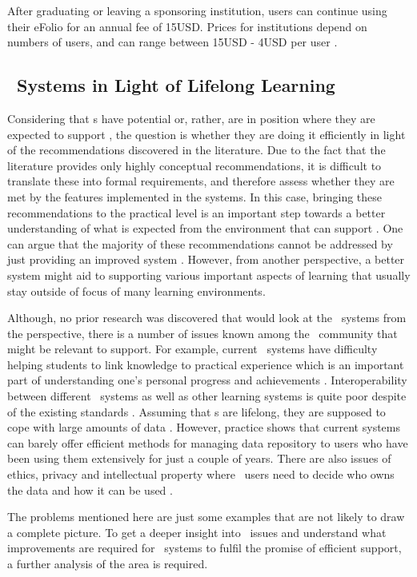 After graduating or leaving a sponsoring institution, users can continue
using their eFolio for an annual fee of 15USD. Prices for institutions depend
on numbers of users, and can range between 15USD - 4USD per user
\citep{AAEEBL2011}.

\subsection{\ep~Systems in Light of Lifelong Learning}

Considering that \ep s have potential or, rather, are in position where they are
expected to support \LLLsn, the question is whether they are doing it
efficiently in light of the recommendations discovered in the literature. Due
to the fact that the literature provides only highly conceptual recommendations,
it is difficult to translate these into formal requirements, and therefore
assess whether they are met by the features implemented in the systems. In this
case, bringing these recommendations to the practical level is an important step
towards a better understanding of what is expected from the environment that can
support \LLLsn. One can argue that the majority of these recommendations cannot
be addressed by just providing an improved system \citep{Schaffert2008}.
However, from another perspective, a better system might aid to supporting
various important aspects of learning that usually stay outside of focus of many
learning environments.

Although, no prior research was discovered that would look at the \ep~systems
from the \LLLs perspective, there is a number of issues known among the
\ep~community that might be relevant to \LLLs support. For example, current
\ep~systems have difficulty helping students to link knowledge to practical
experience which is an important part of understanding one's personal progress
and achievements \citep{Chou2009}. Interoperability between different
\ep~systems as well as other learning systems is quite poor despite of the
existing standards \citep{Clark2011}. Assuming that \ep s are lifelong, they are
supposed to cope with large amounts of data \citep{Butler2010}. However,
practice shows that current systems can barely offer efficient methods for
managing data repository to users who have been using them extensively for just
a couple of years. There are also issues of ethics, privacy and intellectual
property where \ep~users need to decide who owns the data and how it can be used
\citep{Challis2005}.

The problems mentioned here are just some examples that are not likely to draw a
complete picture. To get a deeper insight into \ep~issues and understand what
improvements are required for \ep~systems to fulfil the promise of efficient
\LLLs support, a further analysis of the area is required.

